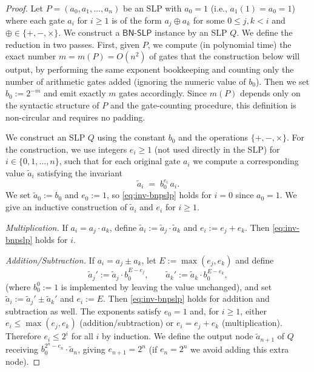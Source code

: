\documentclass{article}
\theoremstyle{plain}
\theoremstyle{definition}
\theoremstyle{remark}
\begin{document}
\begin{proof}
	Let $P=(a_0,a_1,\ldots,a_n)$ be an SLP with $a_0=1$ (i.e., $a_1(1)=a_0=1$) where each gate $a_i$ for $i\ge 1$
	is of the form $a_j\oplus a_k$ for some $0 \leq j,k<i$ and
	$\oplus\in\{+,-,\times\}$.
	We construct a $\mathsf{BN\text{-}SLP}$ instance by an SLP $Q$. We define the reduction in two passes. First, given $P$, we compute (in polynomial time)
	the exact number $m=m(P) = O\left(n^2\right)$ of gates that the construction below will output, by performing
	the same exponent bookkeeping and counting only the number of arithmetic gates added
	(ignoring the numeric value of $b_0$). Then we set $b_0:=2^{-m}$ and emit exactly $m$
	gates accordingly. Since $m(P)$ depends only on the syntactic structure of $P$ and the
	gate-counting procedure, this definition is non-circular and requires no padding.
	
	
	
	We construct an SLP $Q$ using the constant $b_0$ and the operations $\{+,-,\times\}$.
	For the construction, we use integers $e_i\ge 1$ (not used directly in the SLP) for $i\in\{0,1,\ldots,n\}$,
	such that for each original gate $a_i$ we compute a corresponding value $\tilde a_i$ satisfying
	the invariant
	\begin{equation}
		\label{eq:inv-bnpslp}
		\tilde a_i \;=\; b_0^{e_i}\, a_i.
	\end{equation}
	We set $\tilde a_0:=b_0$ and $e_0:=1$, so \eqref{eq:inv-bnpslp} holds for $i=0$ since $a_0=1$.
	We give an inductive construction of $\tilde a_i$ and $e_i$ for $i\ge 1$.
	
	
	\smallskip
	\noindent\emph{Multiplication.}
	If $a_i=a_j\cdot a_k$, define $\tilde a_i:=\tilde a_j\cdot \tilde a_k$ and
	$e_i:=e_j+e_k$. Then \eqref{eq:inv-bnpslp} holds for $i$.
	
	\smallskip
	\noindent\emph{Addition/Subtraction.}
	If $a_i=a_j\pm a_k$, let $E:=\max(e_j,e_k)$ and define
	\[
	\tilde a_j' := \tilde a_j\cdot b_0^{E-e_j},\qquad
	\tilde a_k' := \tilde a_k\cdot b_0^{E-e_k},
	\]
	(where $b_0^0:=1$ is implemented by leaving the value unchanged), and set
	$\tilde a_i:=\tilde a_j'\pm \tilde a_k'$ and $e_i:=E$. Then \eqref{eq:inv-bnpslp} holds for addition and subtraction as well. The exponents satisfy $e_0=1$ and, for $i\ge 1$, either $e_i\le \max(e_j,e_k)$
	(addition/subtraction) or $e_i=e_j+e_k$ (multiplication). Therefore $e_i\le 2^i$
	for all $i$ by induction. We define the output node $\tilde a_{n+1}$ of $Q$ receiving $b_0^{2^n - e_n} \cdot \tilde a_n$, giving $e_{n+1} = 2^n$ (if $e_n = 2^n$ we avoid adding this extra node). 
	

\end{proof}
\end{document}
